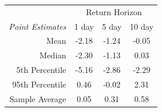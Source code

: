 \begin{tabular}{r | c c c}
\toprule 
& \multicolumn{3}{c}{Return Horizon} \\
\multicolumn{1}{l|}{\textit{Point Estimates}} & 1 day & 5 day & 10 day \\
\midrule 
Mean & -2.18 & -1.24 & -0.05 \\
Median & -2.30 & -1.13 & 0.03 \\
5th Percentile & -5.16 & -2.86 & -2.29 \\ 
95th Percentile & 0.46 & -0.02 & 2.31 \\
\midrule \midrule
Sample Average & 0.05 & 0.31 & 0.58 \\   
\bottomrule
\end{tabular}